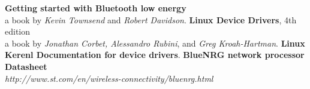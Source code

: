 \begin{thebibliography}{9}
	\textbf{Getting started with Bluetooth low energy}\\
		a book by \textit{Kevin Townsend} and \textit{Robert Davidson}.
	\textbf{Linux Device Drivers}, 4th edition\\
		a book by \textit{Jonathan Corbet, Alessandro Rubini}, and \textit{Greg Kroah-Hartman}.
	\textbf{Linux Kerenl Documentation for device drivers}.
	\textbf{BlueNRG network processor Datasheet}\\
		\textit{http://www.st.com/en/wireless-connectivity/bluenrg.html}
\end{thebibliography}
